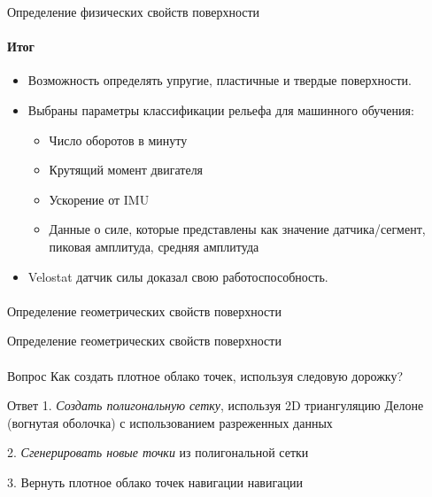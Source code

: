 \documentclass[aspectratio=169,xcolor=table]{beamer}
\begin{document}
\begin{frame}[t]{Определение физических свойств поверхности}
    \framesubtitle{Итог}
    \large
    \begin{itemize}
        \item Возможность определять упругие, пластичные и твердые поверхности.
        \item Выбраны параметры классификации рельефа для машинного обучения:
              \begin{itemize}
                \large
                  \item Число оборотов в минуту
                  \item Крутящий момент двигателя
                  \item Ускорение от IMU
                  \item Данные о силе, которые представлены как значение датчика/сегмент, пиковая амплитуда, средняя амплитуда
              \end{itemize}
        \item Velostat датчик силы доказал свою работоспособность.
    \end{itemize}
\end{frame}

\begin{frame}[c]{}
    \framesubtitle{}
    \centering\LARGE Определение геометрических свойств поверхности
\end{frame}

\begin{frame}[t]{Определение геометрических свойств поверхности}
    \framesubtitle{}
    {\large\begin{block}{Вопрос}
            Как создать плотное облако точек, используя следовую дорожку?
        \end{block}}
    {\large\begin{alertblock}{Ответ}
            1. \textit{Создать полигональную сетку}, используя 2D триангуляцию Делоне (вогнутая оболочка) с использованием разреженных данных

            2. \textit{Сгенерировать новые точки} из полигональной сетки

            3. Вернуть плотное облако точек навигации навигации
        \end{alertblock}}
\end{frame}
\end{document}
